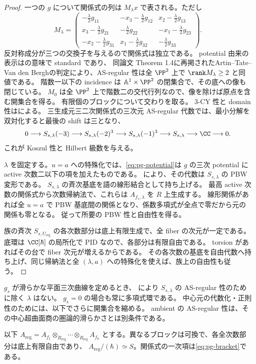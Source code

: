 \begin{proof}
一つの $g$ について関係式の列は $M_\lambda x$ で表される。ただし
\begin{equation}
M_\lambda=
\begin{pmatrix}
-\frac\lambda2g_{11}&-x_3-\frac\lambda2g_{12}&x_2-\frac\lambda2g_{13}\\
x_3-\frac\lambda2g_{21}&-\frac\lambda2g_{22}&-x_1-\frac\lambda2g_{23}\\
-x_2-\frac\lambda2g_{31}&x_1-\frac\lambda2g_{32}&-\frac\lambda2g_{33}
\end{pmatrix}.
\end{equation}
反対称成分が三つの交換子を与えるので関係式は独立である。
potential 由来の表示は\cite[Corollary 2.7]{PMoriSmith}の意味で standard であり、
同論文 Theorem 1.4に再掲されたArtin--Tate--Van den Berghの判定により、AS-regular 性は全 $\PP^2$ 上で $\rank M_\lambda\geq2$ と同値である。
階数一以下の incidence は $\mathbb A^1\times\PP^2$ の閉集合で、その底への像も閉じている。
$M_0$ は全 $\PP^2$ 上で階数二の交代行列なので、像を除けば原点を含む開集合を得る。
有限個のブロックについて交わりを取る。
3-CY 性と domain 性は\cite[Corollary 2.9]{PMoriSmith}による。
三生成元三二次関係式の三次元 AS-regular 代数では、最小分解を双対化すると最後の shift は三となり、
\begin{equation}
0\longrightarrow S_{s,\lambda}(-3)\longrightarrow S_{s,\lambda}(-2)^3
\longrightarrow S_{s,\lambda}(-1)^3\longrightarrow S_{s,\lambda}
\longrightarrow\CC\longrightarrow0.
\end{equation}
これが Koszul 性と Hilbert 級数を与える。

$\lambda$ を固定する。$u=a$ への特殊化では、\eqref{eq:pg-potential}は
$g$ の三次 potential に active 次数二以下の項を加えたものである。
\cite[Theorem 1.1(i)]{PBergerTaillefer}により、その代数は $S_{s,\lambda}$ の PBW 変形である。
$S_{s,\lambda}$ の斉次基底を語の線形結合として持ち上げる。
最高 active 次数の関係式から次数帰納法で、これらは $A_{f_s,\lambda}$ を $R$ 上生成する。
線形関係があれば全 $u=a$ で PBW 基底間の関係となり、係数多項式が全点で零だから元の関係も零となる。
従って所要の PBW 性と自由性を得る。

族の斉次 $S_{s,U_{\mathrm{reg}}}$ の各次数部分は底上有限生成で、全 fiber の次元が一定である。
底環は $\CC[\hbar]$ の局所化で PID なので、各部分は有限自由である。
torsion があればその台で fiber 次元が増えるからである。
その各次数の基底を自由代数へ持ち上げ、同じ帰納法と全 $(\lambda,a)$ への特殊化を使えば、族上の自由性も従う。
\end{proof}
\begin{remark}\label{rem:pg-regular-all}
$g_s$ が滑らかな平面三次曲線を定めるとき、
\cite[Theorem 4.2(1)]{PMoriSmith}により $S_{s,\lambda}$ の AS-regular 性のために除く $\lambda$ はない。
$g_s=0$ の場合も常に多項式環である。
中心元の代数化・正則性のためには、以下でさらに開集合を縮める。
ambient の AS-regular 性は、その中心超曲面商の圏論的滑らかさとは別条件である。
\end{remark}
以下
$A_{\mathrm{reg}}=A_{f_1}\otimes_{R_{\mathrm{reg}}}\cdots\otimes_{R_{\mathrm{reg}}}A_{f_k}$
とする。異なるブロックは可換で、各全次数部分は底上有限自由であり、
$A_{\mathrm{reg}}/(\hbar)\simeq S$。関係式の一次項は\eqref{eq:pg-bracket}である。


